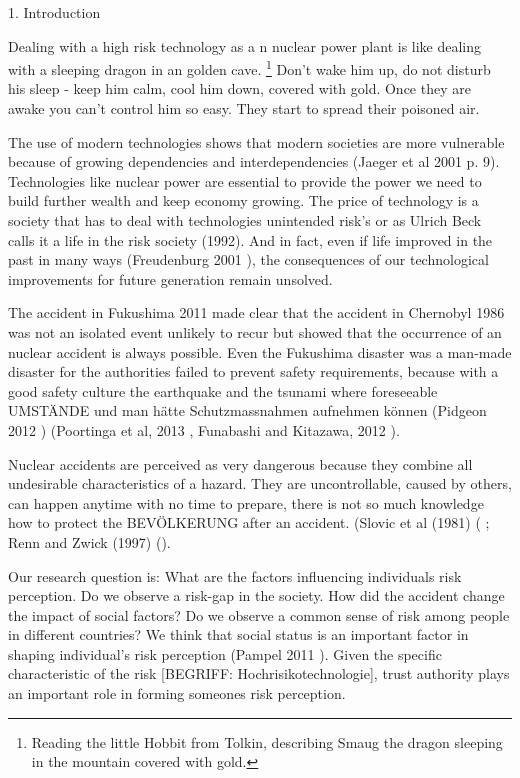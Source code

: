 
1. Introduction   


Dealing with a high risk technology as a n nuclear power plant is like dealing with a sleeping dragon in an golden cave. \footnote{Reading the little Hobbit from Tolkin, describing Smaug the dragon sleeping in the mountain covered with gold.}  Don't wake him up, do not disturb his sleep - keep him calm, cool him down, covered with gold. Once they are awake you can't control him so easy. They start to spread their poisoned air.  

 
The use of modern technologies shows that modern societies are more vulnerable because of growing dependencies and interdependencies (Jaeger et al 2001 p. 9). Technologies like nuclear power are essential to provide the power we need to build further wealth and keep economy growing. The price of technology is a society that has to deal with technologies unintended risk's or as Ulrich Beck calls it a life in the risk society (1992). And in fact, even if life improved in the past in many ways (Freudenburg 2001 \citep{Freudenburg:2001cs}), the consequences of our technological improvements for future generation remain unsolved. 

The accident in Fukushima 2011 made clear that the accident in Chernobyl 1986 was not an isolated event unlikely to recur but showed that the occurrence of an nuclear accident is always possible. Even the Fukushima disaster was a man-made disaster for the authorities failed to prevent safety requirements, because with a good safety culture the earthquake and the tsunami where foreseeable UMSTÄNDE und man hätte Schutzmassnahmen aufnehmen können  (Pidgeon 2012 \citep{Pidgeon:2012ud})  (Poortinga et al, 2013 \citep{Poortinga:2013gt}, Funabashi and Kitazawa, 2012 \citep{Funabashi:2012fs}). 

Nuclear accidents are perceived as very dangerous because they combine all undesirable characteristics of a hazard. They are uncontrollable, caused by others, can happen anytime with no time to prepare, there is not so much knowledge how to protect the BEVÖLKERUNG after an accident. (Slovic et al (1981) ( \citep{Slovic:1981fe}; Renn and Zwick (1997) (\citep{Renn:1997tx, Slovic:1981fe}).   


Our research question is: What are the factors influencing individuals risk perception. Do we observe a risk-gap in the society. How did the accident change the impact of social factors? Do we observe a common sense of risk among people in different countries? We think that social status is an important factor in shaping individual's risk perception (Pampel 2011 \citep{Pampel:2011cx}). Given the specific characteristic of the risk [BEGRIFF: Hochrisikotechnologie], trust authority plays an important role in forming someones risk perception.


